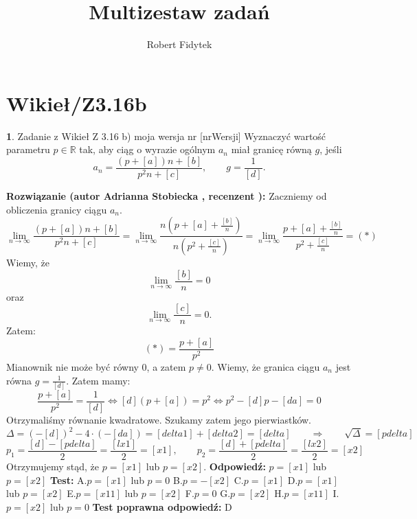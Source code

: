 \documentclass[12pt, a4paper]{article}
\title{Multizestaw zadań}
\author{Robert Fidytek}
\date{}
\theoremstyle{definition} %
\newtheorem{zad}{}
\newcommand{\kategoria}[1]{\section{#1}} %
\newcommand{\zadStart}[1]{\begin{zad}#1\newline} %
\newcommand{\zadStop}{\end{zad}}   %
\newcommand{\rozwStart}[2]{\noindent \textbf{Rozwiązanie (autor #1 , recenzent #2): }\newline} %
\newcommand{\rozwStop}{\newline}                                            %
\newcommand{\odpStart}{\noindent \textbf{Odpowiedź:}\newline}    %
\newcommand{\odpStop}{\newline}                                             %
\newcommand{\testStart}{\noindent \textbf{Test:}\newline} %
\newcommand{\testStop}{\newline} %
\newcommand{\kluczStart}{\noindent \textbf{Test poprawna odpowiedź:}\newline} %
\newcommand{\kluczStop}{\newline} %
\begin{document}
\maketitle


\kategoria{Wikieł/Z3.16b}
\zadStart{Zadanie z Wikieł Z 3.16 b) moja wersja nr [nrWersji]}
Wyznaczyć wartość parametru $p\in\mathbb{R}$ tak, aby ciąg o wyrazie ogólnym $a_n$ miał granicę równą $g$, jeśli
$$a_n=\frac{(p+[a])n+[b]}{p^2n+[c]},\qquad g=\frac{1}{[d]}.$$
\zadStop
\rozwStart{Adrianna Stobiecka}{}
Zaczniemy od obliczenia granicy ciągu $a_n$.
$$\lim_{n\to\infty}\frac{(p+[a])n+[b]}{p^2n+[c]}=\lim_{n\to\infty}\frac{n(p+[a]+\frac{[b]}{n})}{n(p^2+\frac{[c]}{n})}=\lim_{n\to\infty}\frac{p+[a]+\frac{[b]}{n}}{p^2+\frac{[c]}{n}}=(*)$$
Wiemy, że
$$\lim_{n\to\infty}\frac{[b]}{n}=0$$
oraz
$$\lim_{n\to\infty}\frac{[c]}{n}=0.$$
Zatem:
$$(*)=\frac{p+[a]}{p^2}$$
Mianownik nie może być równy $0$, a zatem $p\ne0$. Wiemy, że granica ciągu $a_n$ jest równa $g=\frac{1}{[d]}$. Zatem mamy:
$$\frac{p+[a]}{p^2}=\frac{1}{[d]}\Leftrightarrow[d](p+[a])=p^2\Leftrightarrow p^2-[d]p-[da]=0$$
Otrzymaliśmy równanie kwadratowe. Szukamy zatem jego pierwiastków.
$$\Delta=(-[d])^2-4\cdot(-[da])=[delta1]+[delta2]=[delta]\qquad\Rightarrow\qquad\sqrt{\Delta}=[pdelta]$$
$$p_1=\frac{[d]-[pdelta]}{2}=\frac{[lx1]}{2}=[x1],\qquad p_2=\frac{[d]+[pdelta]}{2}=\frac{[lx2]}{2}=[x2]$$
Otrzymujemy stąd, że $p=[x1]$ lub $p=[x2]$.
\rozwStop
\odpStart
 $p=[x1]$ lub $p=[x2]$
\odpStop
\testStart
A.$p=[x1]$ lub $p=0$
B.$p=-[x2]$
C.$p=[x1]$
D.$p=[x1]$ lub $p=[x2]$
E.$p=[x11]$ lub $p=[x2]$
F.$p=0$
G.$p=[x2]$
H.$p=[x11]$
I.$p=[x2]$ lub $p=0$
\testStop
\kluczStart
D
\kluczStop
\end{document}
